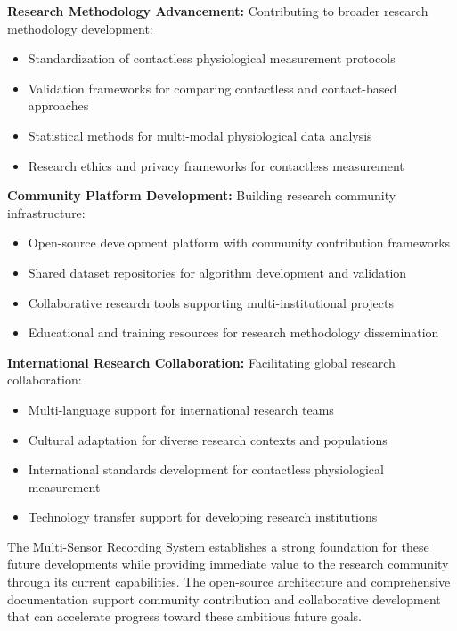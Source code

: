 \documentclass[12pt,a4paper]{report}
\begin{document}
\textbf{Research Methodology Advancement:}
Contributing to broader research methodology development:

\begin{itemize}
\item Standardization of contactless physiological measurement protocols
\item Validation frameworks for comparing contactless and contact-based approaches
\item Statistical methods for multi-modal physiological data analysis
\item Research ethics and privacy frameworks for contactless measurement

\end{itemize}
\textbf{Community Platform Development:}
Building research community infrastructure:

\begin{itemize}
\item Open-source development platform with community contribution frameworks
\item Shared dataset repositories for algorithm development and validation
\item Collaborative research tools supporting multi-institutional projects
\item Educational and training resources for research methodology dissemination

\end{itemize}
\textbf{International Research Collaboration:}
Facilitating global research collaboration:

\begin{itemize}
\item Multi-language support for international research teams
\item Cultural adaptation for diverse research contexts and populations
\item International standards development for contactless physiological measurement
\item Technology transfer support for developing research institutions

\end{itemize}
The Multi-Sensor Recording System establishes a strong foundation for these future developments while providing
immediate value to the research community through its current capabilities. The open-source architecture and
comprehensive documentation support community contribution and collaborative development that can accelerate progress
toward these ambitious future goals.
\end{document}
